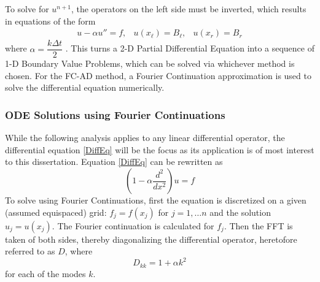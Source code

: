 \documentclass[11pt]{amsart}
\begin{document}
To solve for $u^{n+1}$, the operators on the left side must be inverted, which results in equations of the form 
\begin{eqnarray} \label{DiffEq}
u-\alpha u'' = f, & u(x_{\ell})=B_{\ell}, & u(x_r)=B_r 
\end{eqnarray}
where $\alpha=\dfrac{k\Delta t}{2}$ \cite{FCAD1}.  This turns a 2-D Partial Differential Equation into a sequence of 1-D Boundary Value Problems, which can be solved via whichever method is chosen.  For the FC-AD method, a Fourier Continuation approximation is used to solve the differential equation numerically.  \\ 




\subsubsection{ODE Solutions using Fourier Continuations}
While the following analysis applies to any linear differential operator, the differential equation \ref{DiffEq} will be the focus as its application is of most interest to this dissertation.  
Equation \ref{DiffEq} can be rewritten as 
\begin{equation}
(1-\alpha \dfrac{d^2}{dx^2})u=f
\end{equation}
To solve using Fourier Continuations, first the equation is discretized on a given (assumed equispaced) grid: $f_j=f(x_j)$ for $j=1,\ldots n$ and the solution $u_j=u(x_j)$.  
The Fourier continuation is calculated for $f_j$.  Then the FFT is taken of both sides, thereby diagonalizing the differential operator, heretofore referred to as $D$, where 
\begin{equation}
D_{kk}=1+\alpha k^2
\end{equation}
for each of the modes $k$.  
\end{document}
